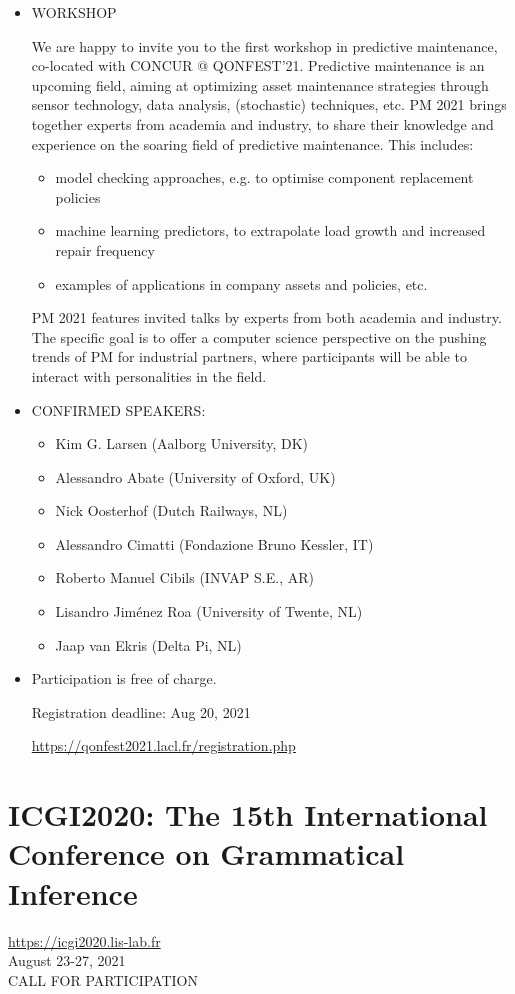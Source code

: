 \documentclass[prodmode,acmtecs]{acmsmall} %
\begin{document}
\begin{itemize}\item  WORKSHOP 
 
  We are happy to invite you to the first workshop in predictive maintenance, co-located with CONCUR @ QONFEST'21. Predictive maintenance is an upcoming field, aiming at optimizing asset maintenance strategies through sensor technology, data analysis, (stochastic) techniques, etc. PM 2021 brings together experts from academia and industry, to share their knowledge and experience on the soaring field of predictive maintenance. This includes: 
 
\begin{itemize}\item  model checking approaches, e.g. to optimise component replacement policies
\item  machine learning predictors, to extrapolate load growth and increased repair frequency
\item  examples of applications in company assets and policies, etc.
\end{itemize} 
  PM 2021 features invited talks by experts from both academia and industry. The specific goal is to offer a computer science perspective on the pushing trends of PM for industrial partners, where participants will be able to interact with personalities in the field. 
 
\item  CONFIRMED SPEAKERS: 
 
\begin{itemize}\item  Kim G. Larsen  (Aalborg University, DK)
\item  Alessandro Abate  (University of Oxford, UK)
\item  Nick Oosterhof  (Dutch Railways, NL)
\item  Alessandro Cimatti  (Fondazione Bruno Kessler, IT)
\item  Roberto Manuel Cibils  (INVAP S.E., AR)
\item  Lisandro Jiménez Roa  (University of Twente, NL)
\item  Jaap van Ekris  (Delta Pi, NL)
\end{itemize} 
\item  Participation is free of charge.  
 
Registration deadline: Aug 20, 2021 
 
  \href{https://qonfest2021.lacl.fr/registration.php}{https://qonfest2021.lacl.fr/registration.php} 
 
\end{itemize}\section{ICGI2020: The 15th International Conference on Grammatical Inference}\label{ICGI2020}  \href{https://icgi2020.lis-lab.fr}{https://icgi2020.lis-lab.fr}\\ 
  August 23-27, 2021\\ 
CALL FOR PARTICIPATION 
\end{document}
